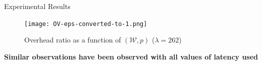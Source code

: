 \documentclass{beamer}
\begin{document}

\begin{frame}{Experimental Results}

        \begin{figure}
            \texttt{[image: OV-eps-converted-to-1.png]}
            \caption{Overhead ratio as a function of $(\mathcal{W},p)$
                ($\lambda = 262$)} \label{fig:accuracy}
        \end{figure}
        \begin{center}
        \textbf{Similar observations have been observed with all values of latency used}
        \end{center}

\end{frame}
\end{document}
